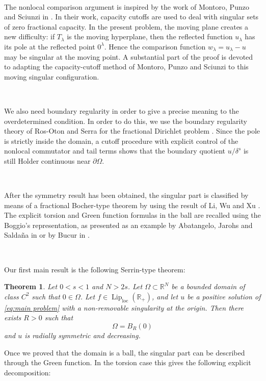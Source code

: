 \documentclass[11pt,a4paper]{article}
\newtheorem{theorem}{Theorem}[section]
\newcommand{\R}{\mathbb R}
\newcommand{\Lip}{\operatorname{Lip}}
\newcommand{\loc}{\mathrm{loc}}
\begin{document}
\

The nonlocal comparison argument is inspired by the work of Montoro, Punzo and Sciunzi in \cite{MPS}. In their work, capacity cutoffs are used to deal with singular sets of zero fractional capacity. In the present problem, the moving plane creates a new difficulty: if \(T_\lambda\) is the moving hyperplane, then the reflected function \(u_\lambda\) has its pole at the reflected point \(0^\lambda\). Hence the comparison function \(w_\lambda=u_\lambda-u\) may be singular at the moving point. A substantial part of the proof is devoted to adapting the capacity-cutoff method of Montoro, Punzo and Sciunzi \cite{MPS} to this moving singular configuration.

\

We also need boundary regularity in order to give a precise meaning to the overdetermined condition. In order to do this, we use the boundary regularity theory of Ros-Oton and Serra for the fractional Dirichlet problem \cite{RosOtonSerra}. Since the pole is strictly inside the domain, a cutoff procedure with explicit
control of the nonlocal commutator and tail terms shows that the boundary
quotient \(u/\delta^s\) is still Holder continuous near \(\partial\Omega\). 

\

After the symmetry result has been obtained, the singular part is classified by means of a fractional Bocher-type theorem by using the result of Li, Wu and Xu \cite{LiWuXu}. The explicit torsion and Green function formulas in the ball are recalled using the Boggio's representation, as presented as an example by Abatangelo, Jarohs and Salda\~na in \cite{AbatangeloJarohsSaldana} or by Bucur in \cite{Bucur}.

\

Our first main result is the following  Serrin-type theorem:

\begin{theorem}\label{main}
Let \(0<s<1\) and \(N>2s\). Let \(\Omega\subset\R^N\) be a bounded domain of class \(C^2\) such that \(0\in\Omega\). Let \(f\in\Lip_{\loc}(\R_+)\), and let \(u\) be a positive solution of \eqref{eq:main problem} with a non-removable singularity at the origin. Then there exists \(R>0\) such that
\[
\Omega=B_R(0)
\]
and $u$ is radially symmetric and decreasing.
\end{theorem}

Once we proved that the domain is a ball, the singular part can be described through the Green function. In the torsion case this gives the following explicit decomposition:
\end{document}
